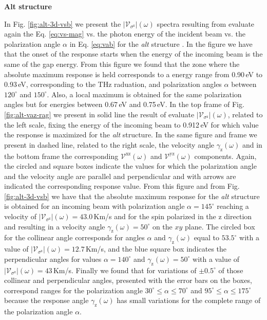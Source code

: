 \documentclass[prb,11pt,tightenlines,twocolumn,aps]{revtex4-1}
\begin{document}
\textbf{Alt structure}

In Fig. \ref{fig:alt-3d-vsb} we present the
$|\mathcal{V}_{\sigma^{\mathrm{z}}}|(\omega)$ spectra resulting from evaluate
again the Eq. \eqref{eq:vs-mag} vs. the photon energy of the incident beam vs.
the polarization angle $\alpha$ in Eq. \eqref{eq:vab} for the \emph{alt}
structure . In the figure we have that the onset of the response starts when the
energy of the incoming beam is the same of the gap energy.
% 
From this figure we found that the zone where the absolute maximum response is
held corresponds to a energy range from 0.90\,eV to 0.93\,eV, corresponding to
the THz raduation, and polarization angles $\alpha$ between $120^{\circ}$ and
$150^{\circ}$. Also, a local maximum is obtained for the same polarization
angles but for energies between 0.67\,eV and 0.75\,eV.
% 
In the top frame of Fig. \ref{fig:alt-vaz-rag} we present in solid line the
result of evaluate $|\mathcal{V}_{\sigma^{\mathrm{z}}}|(\omega)$, related to the
left scale, fixing the energy of the incoming beam to 0.912\,eV for which value
the response is maximized for the \emph{alt} structure. In the same figure and
frame we present in dashed line, related to the right scale, the velocity angle
$\gamma_{\mathrm{z}}(\omega)$ and in the bottom frame the corresponding
$\mathcal{V}^{\mathrm{xz}}(\omega)$ and $\mathcal{V}^{\mathrm{yz}}(\omega)$
components. Again, the circled and square boxes indicate the values for which
the polarization angle and the velocity angle are parallel and perpendicular and
with arrows are indicated the corresponding response value.
% 
From this figure and from Fig. \ref{fig:alt-3d-vsb} we have that the absolute
maximum response for the \emph{alt} structure is obtained for an incoming beam
with polarization angle $\alpha=145^{\circ}$ reaching a velocity of
$|\mathcal{V}_{\sigma^{\mathrm{z}}}|(\omega)=43.0$\,Km/s and for the spin
polarized in the $\mathrm{z}$ direction and resulting in a velocity angle
$\gamma_{\mathrm{z}}(\omega)=50^{\circ}$ on the $xy$ plane. The circled box for
the collinear angle corresponds for angles $\alpha$ and
$\gamma_{\mathrm{z}}(\omega)$ equal to $53.5^{\circ}$ with a value of
$|\mathcal{V}_{\sigma^{\mathrm{z}}}|(\omega)=12.7$\,Km/s, and the blue square
box indicates the perpendicular angles for values $\alpha=140^{\circ}$ and
$\gamma_{\mathrm{z}}(\omega)=50^{\circ}$ with a value of
$|\mathcal{V}_{\sigma^{\mathrm{z}}}|(\omega)=43$\,Km/s. Finally we found that
for variations of $\pm0.5^{\circ}$ of those collinear and perpendicular angles,
presented with the error bars on the boxes, correspond ranges for the
polarization angle $30^{\circ} \leq \alpha \leq 70^{\circ}$ and $95^{\circ} \leq
\alpha \leq 175^{\circ}$ because the response angle
$\gamma_{\mathrm{z}}(\omega)$ has small variations for the complete range of the
polarization angle $\alpha$.
\end{document}
